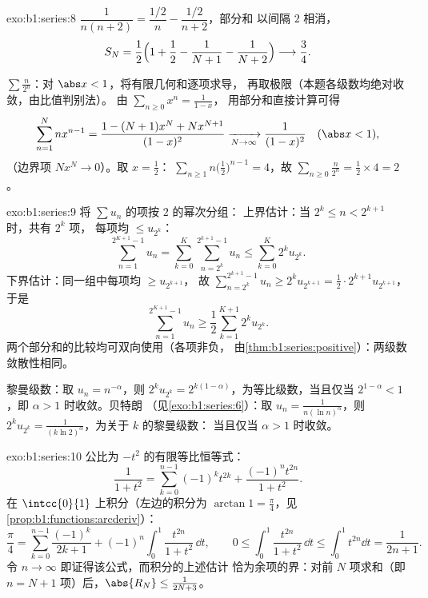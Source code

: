 \begin{solution}{exo:b1:series:8}
$\dfrac{1}{n(n+2)} = \dfrac{1/2}{n} - \dfrac{1/2}{n+2}$，部分和
以间隔 $2$ 相消，
\[
S_N = \frac12\Bigl(1 + \frac12 - \frac{1}{N+1} -
\frac{1}{N+2}\Bigr) \longrightarrow \frac34 .
\]

$\sum \frac{n}{2^n}$：对 $\abs x < 1$，将有限几何和逐项求导，
再取极限（本题各级数均绝对收敛，由比值判别法）。
由 $\sum_{n\geq0} x^n = \frac{1}{1-x}$，
用部分和直接计算可得
\[
\sum_{n=1}^{N} n x^{n-1}
= \frac{1 - (N+1)x^N + N x^{N+1}}{(1 - x)^2}
\xrightarrow[N\to\infty]{} \frac{1}{(1-x)^2}
\quad (\abs x < 1),
\]
（边界项 $N x^N \to 0$）。取 $x = \frac12$：
$\sum_{n\geq1} n\bigl(\frac12\bigr)^{n-1} = 4$，故 $\sum_{n\geq0}
\frac{n}{2^n} = \frac12 \times 4 = 2$。
\end{solution}

\begin{solution}{exo:b1:series:9}
将 $\sum u_n$ 的项按 $2$ 的幂次分组：
上界估计：当 $2^k \leq n < 2^{k+1}$ 时，共有 $2^k$ 项，
每项均 $\leq u_{2^k}$：
\[
\sum_{n=1}^{2^{K+1}-1} u_n
= \sum_{k=0}^{K} \sum_{n=2^k}^{2^{k+1}-1} u_n
\leq \sum_{k=0}^{K} 2^k u_{2^k} .
\]
下界估计：同一组中每项均 $\geq u_{2^{k+1}}$，
故 $\sum_{n=2^k}^{2^{k+1}-1} u_n \geq 2^k u_{2^{k+1}} = \frac12
\cdot 2^{k+1} u_{2^{k+1}}$，于是
\[
\sum_{n=1}^{2^{K+1}-1} u_n \geq \frac12 \sum_{k=1}^{K+1} 2^{k}
u_{2^{k}} .
\]
两个部分和的比较均可双向使用（各项非负，
由\cref{thm:b1:series:positive}）：两级数敛散性相同。

黎曼级数：取 $u_n = n^{-\alpha}$，则 $2^k u_{2^k} =
2^{k(1-\alpha)}$，为等比级数，当且仅当 $2^{1 - \alpha}
< 1$，即 $\alpha > 1$ 时收敛。贝特朗
（见\cref{exo:b1:series:6}）：取 $u_n = \frac{1}{n(\ln n)^\alpha}$，则
$2^k u_{2^k} = \frac{1}{(k\ln 2)^\alpha}$，为关于 $k$ 的黎曼级数：
当且仅当 $\alpha > 1$ 时收敛。
\end{solution}

\begin{solution}{exo:b1:series:10}
公比为 $-t^2$ 的有限等比恒等式：
\[
\frac{1}{1 + t^2} = \sum_{k=0}^{n-1} (-1)^k t^{2k}
+ \frac{(-1)^n t^{2n}}{1 + t^2} .
\]
在 $\intcc{0}{1}$ 上积分（左边的积分为 $\arctan
1 = \frac\pi4$，见\cref{prop:b1:functions:arcderiv}）：
\[
\frac{\pi}{4} = \sum_{k=0}^{n-1} \frac{(-1)^k}{2k+1}
+ (-1)^n \int_0^1 \frac{t^{2n}}{1+t^2}\,\dd t,
\qquad
0 \leq \int_0^1 \frac{t^{2n}}{1+t^2}\,\dd t \leq \int_0^1 t^{2n}\dd
t = \frac{1}{2n+1} .
\]
令 $n \to \infty$ 即证得该公式，而积分的上述估计
恰为余项的界：对前
$N$ 项求和（即 $n = N + 1$ 项）后，$\abs{R_N} \leq \frac{1}{2N + 3}$。
\end{solution}

